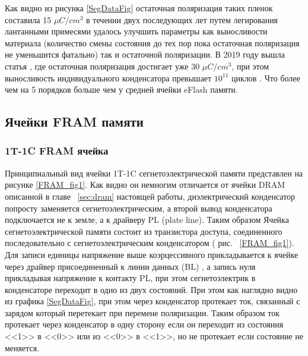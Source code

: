 \documentclass[a4paper,12pt]{article} %
\begin{document}
Как видно из рисунка \eqref{SegDataFig} остаточная поляризация таких пленок составила 15 $\mu C/cm^3 $ в течении двух последующих лет путем легирования лантанными примесями удалось улучшить параметры как выносливости материала (количество смены состояния до тех пор пока остаточная поляризация не уменьшится фатально) так и остаточной поляризации. В 2019 году вышла статья \cite{Segneto_MIPT-IV}, где остаточная поляризация достигает уже 30 $\mu C/cm^3 $, при этом выносливость индивидуального конденсатора превышает $ 10^{11} $ циклов \cite{Segneto_MIPT-IV}. Что более чем на 5 порядков больше чем у средней ячейки eFlash памяти. 







\subsection{Ячейки FRAM памяти}
\subsubsection{1T-1C FRAM ячейка}

Принципиальный вид ячейки 1T-1C сегнетоэлектрической памяти представлен на рисунке \eqref{FRAM_fig1}. Как видно он немногим отличается от ячейки DRAM описанной в главе ~\ref{sec:dram} настоящей работы, диэлектрический конденсатор попросту заменяется сегнетоэлектрическим, а второй вывод конденсатора подключается не к земле, а к драйверу PL (plate  line). Таким образом Ячейка сегнетоэлектрической памяти состоит из транзистора доступа, соединенного последовательно с сегнетоэлектрическим конденсатором ( рис. ~\ref{FRAM_fig1}). Для записи единицы напряжение выше коэрцессивного  прикладывается к ячейке через драйвер присоединенный к линии данных (BL) ,  а запись нуля прикладывая напряжение к контакту PL, при этом сегнетоэлектрик в конденсаторе переходит в одно из двух состояний. При этом как наглядно видно из графика \eqref{SegDataFig}, при этом через конденсатор протекает ток, связанный с зарядом который перетекает при перемене поляризации. Таким образом ток протекает через конденсатор в одну сторону если он переходит из состояния <<1>> в <<0>> или из <<0>> в <<1>>, но не протекает если состояние не меняется. 
\end{document}
